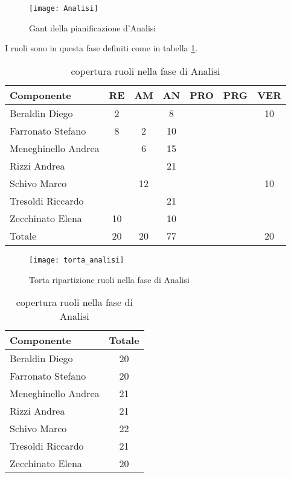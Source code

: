 \begin{figure}[h!]
  \texttt{[image: Analisi]}
\caption{Gant della pianificazione d'Analisi}
\end{figure}
\clearpage
I ruoli sono in questa fase definiti come in tabella \ref{tab:ruolian}.
\begin{table}[h!]
\centering
\begin{tabular}{|l|c|c|c|c|c|c|}
\hline
Componente& RE& AM& AN& PRO& PRG& VER\\
\hline
Beraldin Diego & 2& & 8& & & 10\\
Farronato Stefano & 8& 2& 10& & & \\
Meneghinello Andrea & & 6& 15& & & \\
Rizzi Andrea & & & 21& & & \\
Schivo Marco & & 12& & & & 10\\
Tresoldi Riccardo & & & 21& & & \\
Zecchinato Elena & 10& & 10& & & \\
\hline
Totale & 20& 20& 77& & & 20\\
\hline
\end{tabular}
\caption{copertura ruoli nella fase di Analisi}\label{tab:ruolian}
\end{table}

\begin{figure}[h!]
\centering
  \texttt{[image: torta\_analisi]}
\caption{Torta ripartizione ruoli nella fase di Analisi}
\end{figure}

\begin{table}[h!]
\centering
\begin{tabular}{|l|c|}
\hline
Componente& Totale\\
\hline
Beraldin Diego & 20\\
Farronato Stefano & 20\\
Meneghinello Andrea & 21\\
Rizzi Andrea &  21\\
Schivo Marco & 22\\
Tresoldi Riccardo & 21\\
Zecchinato Elena & 20\\
\hline
\end{tabular}
\caption{copertura ruoli nella fase di Analisi}
\end{table}

\clearpage

